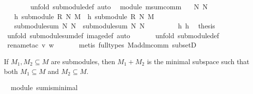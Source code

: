 \begin{isabellebody}
\ \ \ \ \ \ \isamarkupfalse%
\ {\isacharparenleft}unfold\ submodule{\isacharunderscore}def{\isacharcomma}\ auto{\isacharparenright}\isanewline
{}\isamarkupfalse%
%
\endisatagproof
{\isafoldproof}%
%
\isadelimproof
\isanewline
%
\endisadelimproof
\isanewline
{}\isamarkupfalse%
\ {\isacharparenleft}\ module{\isacharparenright}\ msum{\isacharunderscore}comm{\isacharcolon}\isanewline
\ \ \ N{}\ N{}\isanewline
\ \ \ h{}{\isacharcolon}\ {\isachardoublequoteopen}submodule\ R\ N{}\ M{\isachardoublequoteclose}\ \ h{}{\isacharcolon}\ {\isachardoublequoteopen}submodule\ R\ N{}\ M{\isachardoublequoteclose}\isanewline
\ \ \ {\isachardoublequoteopen}{\isacharparenleft}submodule{\isacharunderscore}sum\ N{}\ N{}{\isacharparenright}\ {\isacharequal}\ {\isacharparenleft}submodule{\isacharunderscore}sum\ N{}\ N{}{\isacharparenright}{\isachardoublequoteclose}\isanewline
%
\isadelimproof
%
\endisadelimproof
%
\isatagproof
{}\isamarkupfalse%
\ {\isacharminus}\ \isanewline
\ \ \isanewline
\ \ \isamarkupfalse%
\ h{}\ h{}\ \isamarkupfalse%
\ {\isacharquery}thesis\isanewline
\ \ \ \ \isamarkupfalse%
\ {\isacharparenleft}unfold\ submodule{\isacharunderscore}sum{\isacharunderscore}def\ image{\isacharunderscore}def{\isacharcomma}\ auto{\isacharparenright}\isanewline
\ \ \ \ \ \isamarkupfalse%
\ {\isacharparenleft}unfold\ submodule{\isacharunderscore}def{\isacharparenright}\isanewline
\ \ \ \ \ \isamarkupfalse%
\ {\isacharparenleft}rename{\isacharunderscore}tac\ v\ w{\isacharparenright}\isanewline
\ \ \ \ \ \isamarkupfalse%
\ {\isacharparenleft}metis\ {\isacharparenleft}full{\isacharunderscore}types{\isacharparenright}\ M{\isachardot}add{\isachardot}m{\isacharunderscore}comm\ subsetD{\isacharparenright}{\isacharplus}\isanewline
\ \ \ \ \isanewline
{}\isamarkupfalse%
%
\endisatagproof
{\isafoldproof}%
%
\isadelimproof
%
\endisadelimproof
%
\begin{isamarkuptext}%
If $M_1,M_2\subseteq M$ are submodules, then $M_1+M_2$ is the minimal subspace such that 
both $M_1\subseteq M$ and $M_2\subseteq M$.%
\end{isamarkuptext}%
\isamarkuptrue%
\isamarkupfalse%
\ {\isacharparenleft}\ module{\isacharparenright}\ sum{\isacharunderscore}is{\isacharunderscore}minimal{\isacharcolon}\isanewline

\end{isabellebody}
